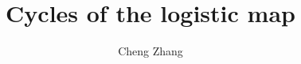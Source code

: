 \documentclass{ws-ijbc}
\begin{document}
\newcommand{\odd}{\mathrm{odd}}
\newcommand{\even}{\mathrm{even}}

\newcommand{\vct}[1]{\mathbf{#1}}




\newcommand{\vx}[1]{\vct x_{#1}}
\newcommand{\vy}[1]{\vct y_{#1}}
\newcommand{\vz}[1]{\vct z_{#1}}
\newcommand{\Tr}{\mathrm{Tr}}
\newcommand{\Pset}{\mathcal P}
\newcommand{\NB}{N_\Pset}
\newcommand{\LB}{L_\Pset}
\newcommand{\lam}{(\lambda)}
\newcommand{\Rlam}{(R, \lambda)}
\newcommand{\rlam}{(r, \lambda)}

\newcommand{\eq}{Eq.}
\newcommand{\eqs}{Eqs.}
\newcommand{\req}[1]{(\ref{eq:#1})}
\newcommand{\refeq}[1]{\eq\,\req{#1}}
\newcommand{\refeqs}[1]{\eqs\,\req{#1}}
\newcommand{\reqsub}[2]{(\ref{eq:#1}#2)}
\newcommand{\refeqsub}[2]{\eq\,\reqsub{#1}{#2}}
\newcommand{\refeqssub}[2]{\eqs\,\reqsub{#1}{#2}}

\newcommand{\refthm}[1]{Theorem \ref{thm:#1}}
\newcommand{\refthms}[1]{Theorems \ref{thm:#1}}
\newcommand{\refsec}[1]{Section \ref{sec:#1}}
\newcommand{\refsecs}[1]{Sections \ref{sec:#1}}
\newcommand{\refapd}[1]{Appendix \ref{apd:#1}}
\newcommand{\reftab}[1]{Table \ref{tab:#1}}
\newcommand{\reftabs}[1]{Tables \ref{tab:#1}}
\newcommand{\reffig}[1]{Fig. \ref{fig:#1}}
\newcommand{\reffigs}[1]{Figs. \ref{fig:#1}}



\catchline{}{}{}{}{}




\title{Cycles of the logistic map}
\author{Cheng Zhang}
\address{Applied Physics Program \& Department of Bioengineering,
Rice University, Houston, TX 77005, USA}

\maketitle


\begin{history}
\received{}
\end{history}
\end{document}
